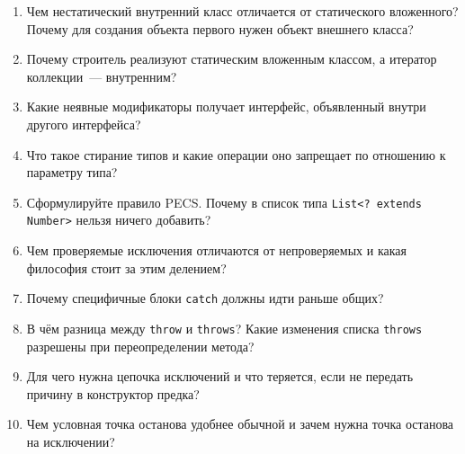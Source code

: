 \begin{enumerate}
\item Чем нестатический внутренний класс отличается от статического вложенного?
      Почему для создания объекта первого нужен объект внешнего класса?
\item Почему строитель реализуют статическим вложенным классом, а итератор
      коллекции~--- внутренним?
\item Какие неявные модификаторы получает интерфейс, объявленный внутри другого
      интерфейса?
\item Что такое стирание типов и какие операции оно запрещает по отношению к
      параметру типа?
\item Сформулируйте правило PECS. Почему в список типа
      \texttt{List<? extends Number>} нельзя ничего добавить?
\item Чем проверяемые исключения отличаются от непроверяемых и какая философия
      стоит за этим делением?
\item Почему специфичные блоки \texttt{catch} должны идти раньше общих?
\item В чём разница между \texttt{throw} и \texttt{throws}? Какие изменения
      списка \texttt{throws} разрешены при переопределении метода?
\item Для чего нужна цепочка исключений и что теряется, если не передать
      причину в конструктор предка?
\item Чем условная точка останова удобнее обычной и зачем нужна точка останова
      на исключении?
\end{enumerate}

\testzadaniya

